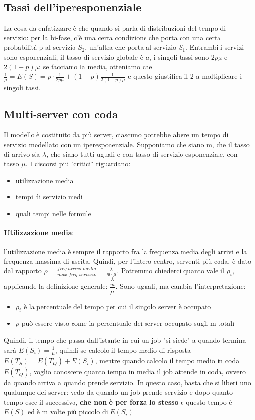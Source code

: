 \documentclass{article}
\begin{document}
\subsection{Tassi dell'iperesponenziale}
La cosa da enfatizzare è che quando si parla di distribuzioni del tempo di servizio: per la bi-fase, c'è una certa condizione che porta con una certa probabilità p al servizio $S_2$, un'altra che porta al servizio $S_1$. Entrambi i servizi sono esponenziali, il tasso di servizio globale è $\mu$, i singoli tassi sono $2p\mu$ e $2(1-p)\mu$: se facciamo la media, otteniamo che $\frac{1}{\mu} = E(S) = p\cdot \frac{1}{2p\mu}  + (1 - p)\frac{1}{2(1 - p)\mu}$ e questo giustifica il 2 a moltiplicare i singoli tassi.
\subsection{Multi-server con coda }
Il modello è costituito da più server, ciascuno potrebbe abere un tempo di servizio modellato con un iperesponenziale. Supponiamo che siano m, che il tasso di arrivo sia $\lambda$, che siano tutti uguali e con tasso di servizio esponenziale, con tasso $\mu$. I discorsi più "critici" riguardano:
\begin{itemize}
\item utilizzazione media
\item tempi di servizio medi
\item quali tempi nelle formule
\end{itemize}
\paragraph{Utilizzazione media:}l'utilizzazione media è sempre il rapporto fra la frequenza media degli arrivi e la frequenza massima di uscita. Quindi, per l'intero centro, serventi più coda, è dato dal rapporto $\rho = \frac{freq\_arrivo\_media}{max\_freq\_servizio} = \frac{\lambda}{m\cdot \mu}$. Potremmo chiederci quanto vale il $\rho_i$, applicando la definizione generale: $\dfrac{\frac{\lambda}{m}}{\mu}$. Sono uguali, ma cambia l'interpretazione:
\begin{itemize}
\item $\rho_i$ è la percentuale del tempo per cui il singolo server è occupato
\item $\rho$ può essere visto come la percentuale dei server occupato sugli m totali
\end{itemize}
Quindi, il tempo che passa dall'istante in cui un job "si siede" a quando termina sarà $E(S_i) = \frac{1}{\mu}$, quindi se calcolo il tempo medio di risposta $E(T_S) = E(T_Q) + E(S_i)$, mentre quando calcolo il tempo medio in coda $E(T_Q)$, voglio conoscere quanto tempo in media il job attende in coda, ovvero da quando arriva a quando prende servizio. In questo caso, basta che si liberi uno qualunque dei server: vedo da quando un job prende servizio e dopo quanto tempo esce il successivo, \textbf{che non è per forza lo stesso} e questo tempo è $E(S)$ ed è m volte più piccolo di $E(S_i)$
\end{document}
